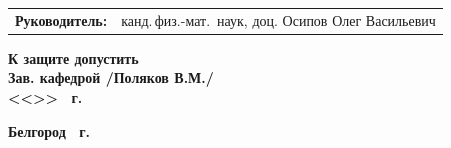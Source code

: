 \documentclass[14pt]{extarticle}
\begin{document}
\begin{titlepage}
\begin{flushleft}
\begin{tabular}{@{}l l@{}}
		\hspace{0cm}\textbf{Руководитель:}    & канд.\,физ.-мат.\ наук, доц. Осипов Олег Васильевич
	\end{tabular}
\end{flushleft}
\vspace{1em}
{\small
\hspace*{10em}\textbf{К защите допустить} \\[-0.5em]
\hspace*{10em}\textbf{Зав. кафедрой \underline{\hspace{4cm}} /Поляков В.М./} \\[0.3em]
\hspace*{12em}\textbf{<<\underline{\hspace{1cm}}>>\underline{\hspace{3cm}} \the\year \ г.}
}

\vspace{1em}
{\centering\small\textbf{Белгород \the\year \ г.}\par}
\end{titlepage}
\end{document}
